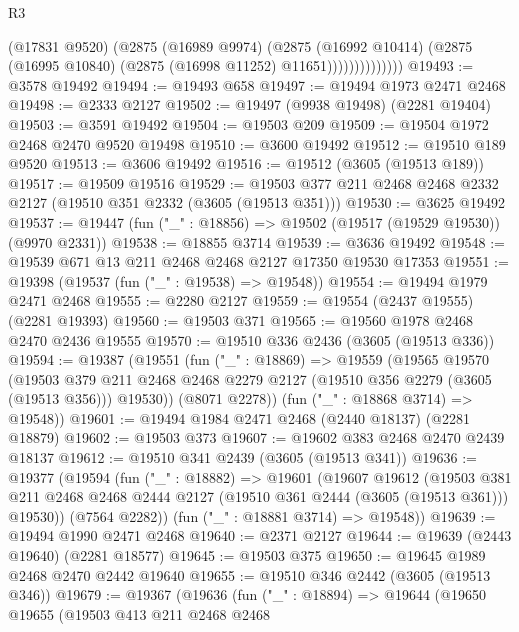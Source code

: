 \begin{lexlean}{R3}
\begin{coremodule}
                        (@17831 @9520)
                        (@2875
                          (@16989 @9974)
                          (@2875
                            (@16992 @10414)
                            (@2875 (@16995 @10840) (@2875 (@16998 @11252) @11651))))))))))))))
@19493 := @3578 @19492
@19494 := @19493 @658
@19497 := @19494 @1973 @2471 @2468
@19498 := @2333 @2127
@19502 := @19497 (@9938 @19498) (@2281 @19404)
@19503 := @3591 @19492
@19504 := @19503 @209
@19509 := @19504 @1972 @2468 @2470 @9520 @19498
@19510 := @3600 @19492
@19512 := @19510 @189 @9520
@19513 := @3606 @19492
@19516 := @19512 (@3605 (@19513 @189))
@19517 := @19509 @19516
@19529 := @19503 @377 @211 @2468 @2468 @2332 @2127 (@19510 @351 @2332 (@3605 (@19513 @351)))
@19530 := @3625 @19492
@19537 := @19447 (fun ("_" : @18856) => @19502 (@19517 (@19529 @19530)) (@9970 @2331))
@19538 := @18855 @3714
@19539 := @3636 @19492
@19548 := @19539 @671 @13 @211 @2468 @2468 @2127 @17350 @19530 @17353
@19551 := @19398 (@19537 (fun ("_" : @19538) => @19548))
@19554 := @19494 @1979 @2471 @2468
@19555 := @2280 @2127
@19559 := @19554 (@2437 @19555) (@2281 @19393)
@19560 := @19503 @371
@19565 := @19560 @1978 @2468 @2470 @2436 @19555
@19570 := @19510 @336 @2436 (@3605 (@19513 @336))
@19594 := @19387
    (@19551
      (fun ("_" : @18869) =>
      @19559
        (@19565
          @19570
          (@19503
            @379
            @211
            @2468
            @2468
            @2279
            @2127
            (@19510 @356 @2279 (@3605 (@19513 @356)))
            @19530))
        (@8071 @2278))
      (fun ("_" : @18868 @3714) => @19548))
@19601 := @19494 @1984 @2471 @2468 (@2440 @18137) (@2281 @18879)
@19602 := @19503 @373
@19607 := @19602 @383 @2468 @2470 @2439 @18137
@19612 := @19510 @341 @2439 (@3605 (@19513 @341))
@19636 := @19377
    (@19594
      (fun ("_" : @18882) =>
      @19601
        (@19607
          @19612
          (@19503
            @381
            @211
            @2468
            @2468
            @2444
            @2127
            (@19510 @361 @2444 (@3605 (@19513 @361)))
            @19530))
        (@7564 @2282))
      (fun ("_" : @18881 @3714) => @19548))
@19639 := @19494 @1990 @2471 @2468
@19640 := @2371 @2127
@19644 := @19639 (@2443 @19640) (@2281 @18577)
@19645 := @19503 @375
@19650 := @19645 @1989 @2468 @2470 @2442 @19640
@19655 := @19510 @346 @2442 (@3605 (@19513 @346))
@19679 := @19367
    (@19636
      (fun ("_" : @18894) =>
      @19644
        (@19650
          @19655
          (@19503
            @413
            @211
            @2468
            @2468

\end{coremodule}
\end{lexlean}
